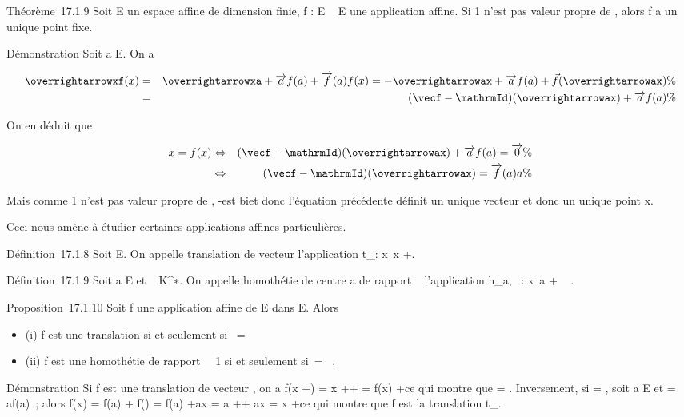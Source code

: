 \documentclass[]{article}
\begin{document}
Théorème~17.1.9 Soit E un espace affine de dimension finie, f : E \rightarrow~ E
une application affine. Si 1 n'est pas valeur propre de
\vecf, alors f a un unique point fixe.

Démonstration Soit a \in E. On a

\begin{align*}
\overrightarrowxf(x)& =&
\overrightarrowxa +\overrightarrow
af(a) +\overrightarrow f(a)f(x) =
-\overrightarrowax +\overrightarrow
af(a) +\vec
f(\overrightarrowax)\%&
\\ & =& (\vecf
-\mathrmId)(\overrightarrowax)
+\overrightarrow af(a) \%&
\\ \end{align*}

On en déduit que

\begin{align*} x = f(x)&
\Leftrightarrow & (\vecf
-\mathrmId)(\overrightarrowax)
+\overrightarrow af(a)
=\overrightarrow 0\%&
\\ & \Leftrightarrow &
(\vecf
-\mathrmId)(\overrightarrowax)
=\overrightarrow f(a)a \%&
\\ \end{align*}

Mais comme 1 n'est pas valeur propre de \vecf,
\vecf -\mathrmId est bi\jmathective et
donc l'équation précédente définit un unique vecteur
\overrightarrowax et donc un unique point x.

Ceci nous amène à étudier certaines applications affines particulières.

Définition~17.1.8 Soit \overrightarrow\xi
\in\overrightarrow E. On appelle translation de vecteur
\overrightarrow\xi l'application
t\_\overrightarrow\xi :
x\mapsto~x +\overrightarrow \xi.

Définition~17.1.9 Soit a \in E et \lambda~ \in K^∗. On appelle
homothétie de centre a de rapport \lambda~ l'application h\_a,\lambda~ :
x\mapsto~a + \lambda~ \overrightarrowax.

Proposition~17.1.10 Soit f une application affine de E dans E. Alors

\begin{itemize}
\itemsep1pt\parskip0pt
\item
  (i) f est une translation si et seulement si~\vecf
  = \mathrmId
\item
  (ii) f est une homothétie de rapport \lambda~\neq~1 si
  et seulement si~\vecf =
  \lambda~\mathrmId.
\end{itemize}

Démonstration Si f est une translation de vecteur
\overrightarrow\xi, on a f(x
+\overrightarrow \eta) = x
+\overrightarrow \eta +\overrightarrow
\xi = f(x) +\overrightarrow \eta ce qui montre que
\vecf = \mathrmId. Inversement, si
\vecf = \mathrmId, soit a \in E et
\overrightarrow\xi =\overrightarrow
af(a)~; alors f(x) = f(a) +\vec
f(\overrightarrowax) = f(a)
+\overrightarrow ax = a
+\overrightarrow \xi +\overrightarrow
ax = x +\overrightarrow \xi ce qui montre que f est
la translation t\_\overrightarrow\xi.
\end{document}
